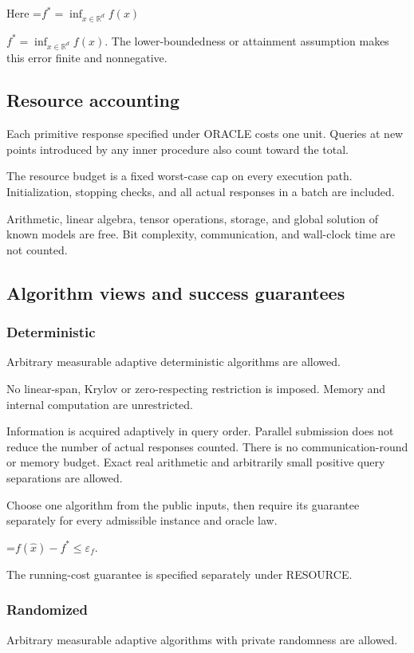 \documentclass[10pt,a4paper]{article}
\newcommand{\AtlasMath}[1]{\par\begingroup\centering\setbox0=\hbox{$\displaystyle #1$}\ifdim\wd0>1.4\linewidth\typeout{ATLAS WIDE FORMULA: \the\wd0}\fi\ifdim\wd0>\linewidth\resizebox{\linewidth}{!}{\box0}\else\box0\fi\par\endgroup}
\newcommand{\AtlasInlineMath}[1]{\begingroup\setbox0=\hbox{$#1$}\ifdim\wd0>.4\linewidth\endgroup\AtlasMath{#1}\else\endgroup$#1$\fi}
\begin{document}
Here \AtlasInlineMath{f^*=\inf_{x\in \mathbb{R}^d}f(x)}. The lower-boundedness or attainment assumption makes this error finite and nonnegative.

\subsection{Resource accounting}
Each primitive response specified under ORACLE costs one unit. Queries at new points introduced by any inner procedure also count toward the total.

The resource budget is a fixed worst-case cap on every execution path. Initialization, stopping checks, and all actual responses in a batch are included.

Arithmetic, linear algebra, tensor operations, storage, and global solution of known models are free. Bit complexity, communication, and wall-clock time are not counted.

\subsection{Algorithm views and success guarantees}
\subsubsection{Deterministic}
Arbitrary measurable adaptive deterministic algorithms are allowed.

No linear-span, Krylov or zero-respecting restriction is imposed. Memory and internal computation are unrestricted.

Information is acquired adaptively in query order. Parallel submission does not reduce the number of actual responses counted. There is no communication-round or memory budget. Exact real arithmetic and arbitrarily small positive query separations are allowed.

Choose one algorithm from the public inputs, then require its guarantee separately for every admissible instance and oracle law.


\AtlasMath{f(\widehat{x})-f^*\le \varepsilon_f.}


The running-cost guarantee is specified separately under RESOURCE.

\subsubsection{Randomized}
Arbitrary measurable adaptive algorithms with private randomness are allowed.
\end{document}
